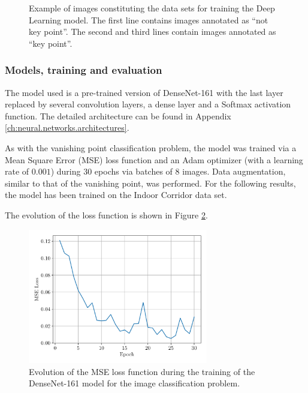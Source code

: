 \begin{figure}[H]
\begin{subfigure}{0.32\textwidth}
    \end{subfigure}
    \caption{Example of images constituting the data sets for training the Deep Learning model. The first line contains images annotated as \enquote{not key point}. The second and third lines contain images annotated as \enquote{key point}.}
    \label{fig:06.classification.data.set.examples}
\end{figure}

\subsubsection{Models, training and evaluation}

The model used is a pre-trained version of DenseNet-161 with the last layer replaced by several convolution layers, a dense layer and a Softmax activation function. The detailed architecture can be found in Appendix \ref{ch:neural.networks.architectures}.

As with the vanishing point classification problem, the model was trained via a Mean Square Error (MSE) loss function and an Adam optimizer (with a learning rate of $\num{0.001}$) during $\num{30}$ epochs via batches of $\num{8}$ images. Data augmentation, similar to that of the vanishing point, was performed. For the following results, the model has been trained on the Indoor Corridor data set.

The evolution of the loss function is shown in Figure \ref{fig:06.classification.densenet161.mse.loss}.

\begin{figure}[H]
    \centering
    \includegraphics[width=0.7\textwidth]{resources/pdf/06/classification/training/densenet161-mse-loss.pdf}
    \caption{Evolution of the MSE loss function during the training of the DenseNet-161 model for the image classification problem.}
    \label{fig:06.classification.densenet161.mse.loss}
\end{figure}

